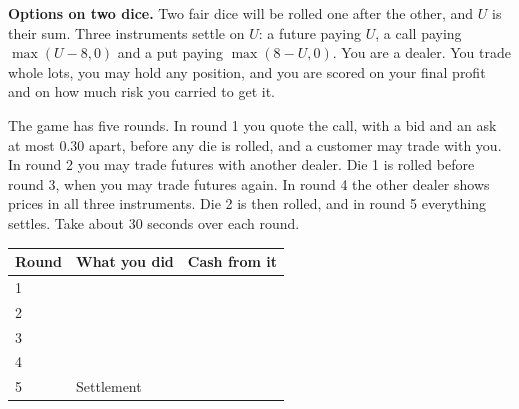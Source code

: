 \begin{question}\label{iq:iv2:played-games:2}
\textbf{Options on two dice.} Two fair dice will be rolled one after the other, and $U$ is their sum. Three instruments settle on $U$: a future paying $U$, a call paying $\max(U - 8, 0)$ and a put paying $\max(8 - U, 0)$. You are a dealer. You trade whole lots, you may hold any position, and you are scored on your final profit and on how much risk you carried to get it.

The game has five rounds. In round 1 you quote the call, with a bid and an ask at most 0.30 apart, before any die is rolled, and a customer may trade with you. In round 2 you may trade futures with another dealer. Die 1 is rolled before round 3, when you may trade futures again. In round 4 the other dealer shows prices in all three instruments. Die 2 is then rolled, and in round 5 everything settles. Take about 30 seconds over each round.

\medskip
\begin{tabular}{@{}l|p{7.5cm}|l@{}}
Round & What you did & Cash from it \\ \hline
1 & & \\[8pt]\hline
2 & & \\[8pt]\hline
3 & & \\[8pt]\hline
4 & & \\[8pt]\hline
5 & Settlement & \\[8pt]\hline
\end{tabular}
\end{question}
\vfill\clearpage

